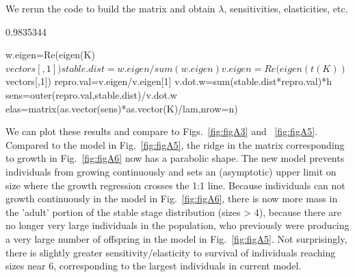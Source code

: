 \documentclass[11pt]{article}
\begin{document}
We rerun the code to build the matrix and obtain $\lambda$, sensitivities, elasticities, etc. 
\begin{Schunk}
\begin{Soutput}
[1] 0.9835344
\end{Soutput}
\begin{Sinput}
 w.eigen=Re(eigen(K)$vectors[,1])
 stable.dist=w.eigen/sum(w.eigen) 
 v.eigen=Re(eigen(t(K))$vectors[,1])
 repro.val=v.eigen/v.eigen[1] 
 v.dot.w=sum(stable.dist*repro.val)*h
 sens=outer(repro.val,stable.dist)/v.dot.w
 elas=matrix(as.vector(sens)*as.vector(K)/lam,nrow=n)
\end{Sinput}
\end{Schunk}

We can plot these results and compare to Figs.~\ref{fig:figA3} and ~\ref{fig:figA5}. Compared to the model in Fig.~\ref{fig:figA5}, the ridge in the matrix corresponding to growth in Fig.~\ref{fig:figA6} now has a parabolic shape. The new model prevents individuals from growing continuously and sets an (asymptotic) upper limit on size where the growth regression crosses the 1:1 line. Because individuals can not growth continuously in the model in Fig.~\ref{fig:figA6}, there is now more mass in the 'adult' portion of the stable stage distribution (sizes > 4), because there are no longer very large individuals in the population, who previously were producing a very large number of offspring in the model in Fig.~\ref{fig:figA5}. Not surprisingly, there is slightly greater sensitivity/elasticity to survival of individuals reaching sizes near 6, corresponding to the largest individuals in current model. 
\end{document}

